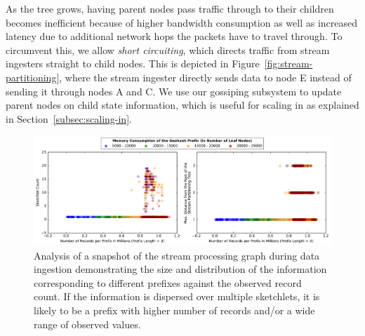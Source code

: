As the tree grows, having parent nodes pass traffic through to their children becomes inefficient because of higher bandwidth consumption as well as increased latency due to additional network hops the packets have to travel through.
To circumvent this, we allow \emph{short circuiting}, which directs traffic from stream ingesters straight to child nodes.
This is depicted in Figure~\ref{fig:stream-partitioning}, where the stream ingester directly sends data to node E instead of sending it through nodes A and C.
We use our gossiping subsystem to update parent nodes on child state information, which is useful for scaling in as explained in Section~\ref{subsec:scaling-in}.
\begin{figure}[t!]
    \centerline{\includegraphics[width=\linewidth]{figures/scaleout_graph_analysis.pdf}}
    \caption{Analysis of a snapshot of the stream processing graph during data ingestion demonstrating the size and distribution of the information corresponding to different prefixes against the observed record count. If the information is dispersed over multiple sketchlets, it is likely to be a prefix with higher number of records and/or a wide range of observed values.}
    \label{fig:scaleout-graph-analysis}
\end{figure}
%


